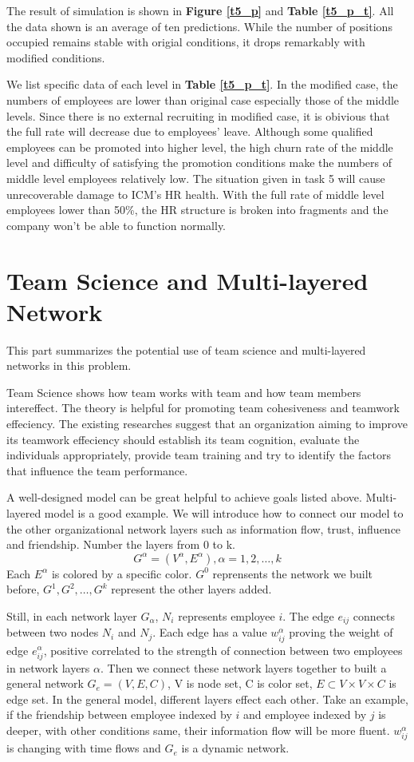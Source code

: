 \documentclass[12pt,a4paper,titlepage]{article}
\begin{document}
The result of simulation is shown in \textbf{Figure \ref{t5_p}} and \textbf{Table
\ref{t5_p_t}}. All the data shown is an average of ten
predictions. While the number of positions occupied remains stable
with origial conditions, it drops remarkably with modified
conditions.

We list specific data of each level in \textbf{Table \ref{t5_p_t}}. In the
modified case, the numbers of employees are lower than original case
especially those of the middle levels. Since there is no external
recruiting in modified case, it is obivious that the full rate will
decrease due to employees' leave. Although some qualified employees
can be promoted into higher level, the high churn rate of the middle
level and difficulty of satisfying the promotion conditions make the
numbers of middle level employees relatively low. The situation given
in task 5 will cause unrecoverable damage to ICM's HR
health. With the full rate of middle level employees lower than 50\%,
the HR structure is broken into fragments and the company won't be
able to function normally.

\section{Team Science and Multi-layered Network}
\label{sec:team-science}
This part summarizes the potential use of team science and multi-layered networks in this problem.

Team Science shows how team works with team and how team members
intereffect. The theory is helpful for promoting team cohesiveness and
teamwork effeciency. The existing researches suggest that an
organization aiming to improve its teamwork effeciency should establish its team
cognition, evaluate the individuals appropriately, provide team
training and try to identify the factors that influence the team performance\cite{8}\cite{9}.

A well-designed model can be great helpful to achieve goals listed above. Multi-layered model is a good example. We will introduce how to connect our model to the other organizational network
layers such as information flow, trust, influence and
friendship. Number the layers from 0 to
k. $$G^\alpha=(V^\alpha,E^\alpha), \alpha=1,2,\ldots,k$$ Each
$E^\alpha$ is colored by a specific color. $G^0$ reprensents the
network we built before, $G^1, G^2, \ldots ,G^k$ represent the other layers added.

Still, in each network layer $G_\alpha$, $N_i$ represents employee
$i$. The edge $e_{ij}$ connects between two nodes $N_i$ and
$N_j$. Each edge has a value $w_{ij}^\alpha$ proving the weight of
edge $e_{ij}^\alpha$, positive correlated to the strength of
connection between two employees in network layers $\alpha$. Then we
connect these network layers together to built a general network
$G_e=(V, E, C)$, V is node set, C is color set, $E\subset V\times
V\times C$ is edge set\cite{10}. In the general model, different layers effect
each other. Take an example, if the friendship between employee indexed by $i$
and employee indexed by $j$ is deeper, with other conditions same, their
information flow will be more fluent. $w_{ij}^\alpha$ is changing with time
flows and $G_e$ is a dynamic network.
\end{document}

